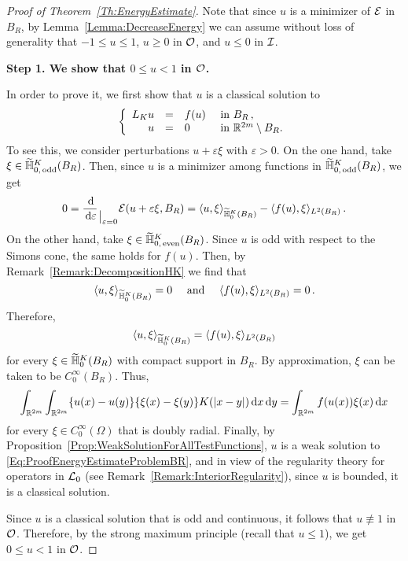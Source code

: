 \begin{proof}[Proof of Theorem~\ref{Th:EnergyEstimate}]

Note that since $u$ is a minimizer of $\mathcal{E}$ in $B_R$, by Lemma~\ref{Lemma:DecreaseEnergy} we can assume without loss of generality that $-1 \leq u \leq 1$, $u \geq 0$ in $\mathcal{O}$, and $u \leq 0$ in $\mathcal{I}$. 

\textbf{Step 1. We show that $0\leq u < 1$ in $\mathcal{O}$.} 

In order to prove it, we first show that $u$ is a classical solution to
\begin{equation}
\label{Eq:ProofEnergyEstimateProblemBR}
	\left\{\begin{array}{rcll}
	L_K  u &=& f(u) & \textrm{ in } B_R\,,\\
	u &=& 0 & \textrm{ in }\mathbb{R}^{2m} \setminus B_R.
	\end{array} \right.
\end{equation}
To see this, we consider perturbations $u +  \varepsilon \xi$ with $\varepsilon>0$. On the one hand, take $\xi \in \widetilde{\mathbb{H}}^K_{0, \,\mathrm{odd}}(B_R)$. Then, since $u$ is a minimizer among functions in $\widetilde{\mathbb{H}}^K_{0, \,\mathrm{odd}}(B_R)$, we get
$$
0 = \dfrac{\,\mathrm{d}}{\,\mathrm{d} \varepsilon}_{\mkern1.5mu\big\vert_{\scriptstyle \varepsilon = 0}} \mathcal{E}(u +  \varepsilon \xi, B_R) = \langle u,\xi \rangle_{\widetilde{\mathbb{H}}^K_0(B_R)} - \langle f(u),\xi \rangle_{L^2(B_R)}\,.
$$
On the other hand, take $\xi \in \widetilde{\mathbb{H}}^K_{0, \,\mathrm{even}}(B_R)$. Since $u$ is odd with respect to the Simons cone, the same holds for $f(u)$. Then, by Remark~\ref{Remark:DecompositionHK} we find that
$$
\langle u,\xi \rangle_{\widetilde{\mathbb{H}}^K_0(B_R)} = 0 \quad \textrm{ and } \quad  \langle f(u),\xi \rangle_{L^2(B_R)} = 0\,.
$$
Therefore, 
$$
\langle u,\xi \rangle_{\widetilde{\mathbb{H}}^K_0(B_R)} = \langle f(u),\xi \rangle_{L^2(B_R)}
$$
for every $\xi \in\widetilde{\mathbb{H}}^K_0(B_R)$ with compact support in  $B_R$. By approximation, $\xi$ can be taken to be $C^\infty_0(B_R)$. Thus,
$$
\int_{\mathbb{R}^{2m}}\int_{\mathbb{R}^{2m}} \{u(x)-u(y)\}\{\xi(x)-\xi(y)\} K(|x-y|) \,\mathrm{d} x \,\mathrm{d} y = \int_{\mathbb{R}^{2m}} f(u(x)) \xi(x) \,\mathrm{d} x
$$
for every $\xi \in C^\infty_0(\Omega)$ that is doubly radial. Finally, by Proposition~\ref{Prop:WeakSolutionForAllTestFunctions}, $u$ is a weak solution to \eqref{Eq:ProofEnergyEstimateProblemBR}, and in view of the regularity theory for operators in $\mathcal{L}_0$ (see Remark~\ref{Remark:InteriorRegularity}), since $u$ is bounded, it is a classical solution.

Since $u$ is a classical solution that is odd and continuous, it follows that $u \not \equiv 1$ in $\mathcal{O}$. Therefore, by the strong maximum principle (recall that $u\leq 1$), we get $0\leq u < 1$ in $\mathcal{O}$. 


\end{proof}
